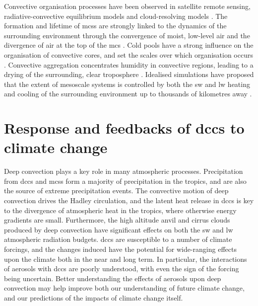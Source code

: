 Convective organisation processes have been observed in satellite remote sensing, radiative-convective equilibrium models and cloud-resolving models \citep{holloway_observing_2017}. 
The formation and lifetime of \acrshort{mcs}s are strongly linked to the dynamics of the surrounding environment through the convergence of moist, low-level air and the divergence of air at the top of the \acrshort{mcs}  \citep{houze_chapter_2014}. 
Cold pools have a strong influence on the organisation of convective cores, and set the scales over which organisation occurs \citep{jeevanjee_convective_2013}.
Convective aggregation concentrates humidity in convective regions, leading to a drying of the surrounding, clear troposphere \citep{bretherton_energybalance_2005}.
Idealised simulations have proposed that the extent of mesoscale systems is controlled by both the \acrshort{sw}  and \acrshort{lw}  heating and cooling of the surrounding environment up to thousands of kilometres away \citep{beucler_budget_2019}. 


\section{Response and feedbacks of \acrshort{dcc}s to climate change}

Deep convection plays a key role in many atmospheric processes.
Precipitation from \acrshort{dcc}s and \acrshort{mcs}s form a majority of precipitation in the tropics, and are also the source of extreme precipitation events.
The convective motion of deep convection drives the Hadley circulation, and the latent heat release in \acrshort{dcc}s is key to the divergence of atmospheric heat in the tropics, where otherwise energy gradients are small.
Furthermore, the high altitude anvil and cirrus clouds produced by deep convection have significant effects on both the \acrshort{sw}  and \acrshort{lw} atmospheric radiation budgets.
\acrshort{dcc}s are susceptible to a number of climate forcings, and the changes induced have the potential for wide-ranging effects upon the climate both in the near and long term.
In particular, the interactions of aerosols with \acrshort{dcc}s are poorly understood, with even the sign of the forcing being uncertain. 
Better understanding the effects of aerosols upon deep convection may help improve both our understanding of future climate change, and our predictions of the impacts of climate change itself.


